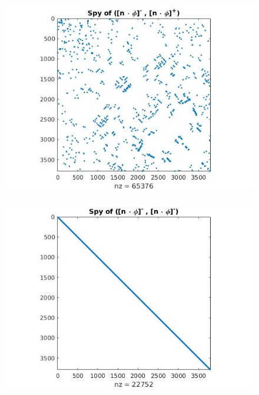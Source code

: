 \documentclass[a4paper]{book}
\begin{document}
\begin{figure}[H]
\begin{minipage}[c]{0.5\textwidth}
    \includegraphics[width=\textwidth]{figure23.jpg}
    \label{fig:figure23}
	\caption{$((n \otimes \phi)^-,(n \otimes \phi)^+)_{\Gamma \cup \Gamma_D}$}      
  \end{minipage}\hfill
    \begin{minipage}[c]{0.5\textwidth}
    \includegraphics[width=\textwidth]{figure24.jpg}
    \label{fig:figure24}
	\caption{$((n \otimes \phi)^-,(n \otimes \phi)^-)_{\Gamma \cup \Gamma_D}$}      
  \end{minipage}\hfill
  \begin{subfigure}{\textwidth}	
\centering

\end{subfigure}
\end{figure}
\end{document}
